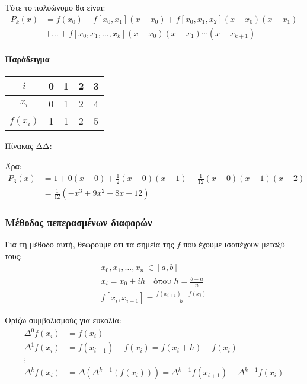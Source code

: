\documentclass[11pt,a4paper,notitlepage,fleqn,draft]{article}
\begin{document}
 	Τότε το πολυώνυμο θα είναι:
 	\begin{align*}
 		P_k(x) &= f(x_0) + f[x_0,x_1](x-x_0) +
 		f[x_0,x_1,x_2](x-x_0)(x-x_1)
 		\\ & + \dots +
 		f[x_0,x_1,\dots,x_k](x-x_0)(x-x_1)\cdots(x-x_{k+1})
 	\end{align*}
 	
 	\paragraph{Παράδειγμα}
 	\hspace{0pt}
 	
 	\begin{tabular}{|c|c|c|c|c|}
 		\hline 
 		\(i\) & 0 & 1 & 2 & 3 \\ 
 		\hline 
 		\(x_i\) & 0 & 1 & 2 & 4 \\ 
 		\hline 
 		\(f(x_i)\) & 1 & 1 & 2 & 5 \\ 
 		\hline 
 	\end{tabular}
 	
 	Πίνακας ΔΔ:
 	
 	Άρα:
 	\begin{align*}
 	P_3(x) &= 1 + 0(x-0) + \frac{1}{2}(x-0)(x-1)-\frac{1}{12}
 	(x-0)(x-1)(x-2) \\ &= \frac{1}{12} (-x^3+9x^2-8x+12)
 	\end{align*}
 	
 	\subsubsection{Μέθοδος πεπερασμένων διαφορών}
 	Για τη μέθοδο αυτή, θεωρούμε ότι τα σημεία της \( f \)
 	που έχουμε ισαπέχουν μεταξύ τους:
 	\begin{gather*}
 		x_0,x_1,\dots,x_n \ \in [a,b] \\
 		x_i = x_0 + ih \quad \text{όπου } h=\frac{b-a}{n}
 		\\[.4ex]
 		f\left[x_i,x_{i+1}\right] =
 		\frac{f(x_{i+1})-f(x_i)}{h}
 	\end{gather*}
 	
 	Ορίζω συμβολισμούς για ευκολία:
 	\begin{align*}
 		\Delta^0 f(x_i) &= f(x_i) \\
 		\Delta^1 f(x_i) &=
 		f(x_{i+1}) - f(x_i) = f(x_i+h) - f(x_i) \\
 		\vdots \\
 		\Delta^k f(x_i) &=
 		\Delta \left(\Delta^{k-1}\left(f(x_i)\right)\right)
 		= \Delta^{k-1} f(x_{i+1}) - \Delta^{k-1} f(x_i)
 	\end{align*}
 	
\end{document}
